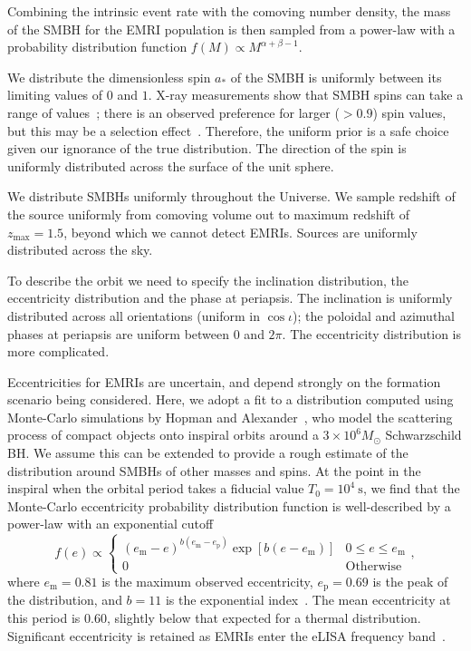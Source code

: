 \documentclass[aps,prd,amsfonts,amssymb,amsmath,nofootinbib,showpacs,superscriptaddress,twocolumn,floatfix]{revtex4-1}
\newcommand{\sub}[1]{\ensuremath{_\mathrm{#1}}}
\begin{document}
Combining the intrinsic event rate with the comoving number density, the mass of the SMBH for the EMRI population is then sampled from a power-law with a probability distribution function $f(M) \propto M^{\alpha+\beta-1}$.

We distribute the dimensionless spin $a_\ast$ of the SMBH is uniformly between its limiting values of $0$ and $1$. X-ray measurements show that SMBH spins can take a range of values~\cite{Reynolds2013a,Patrick2012,Walton2013,BerryThesis2013}; there is an observed preference for larger ($> 0.9$) spin values, but this may be a selection effect~\cite{Brenneman2011}. Therefore, the uniform prior is a safe choice given our ignorance of the true distribution. The direction of the spin is uniformly distributed across the surface of the unit sphere.

We distribute SMBHs uniformly throughout the Universe. We sample redshift of the source uniformly from comoving volume out to maximum redshift of $z\sub{max} = 1.5$, beyond which we cannot detect EMRIs. Sources are uniformly distributed across the sky. 

To describe the orbit we need to specify the inclination distribution, the eccentricity distribution and the   phase at periapsis. The inclination is uniformly distributed across all orientations (uniform in $\cos \iota$); the poloidal and azimuthal phases at periapsis are uniform between $0$ and $2\pi$. The eccentricity distribution is more complicated.

Eccentricities for EMRIs are uncertain, and depend strongly on the formation scenario being considered. Here, we adopt a fit to a distribution computed using Monte-Carlo simulations by Hopman and Alexander~\cite{Hopman2005}, who model the scattering process of compact objects onto inspiral orbits around a $3 \times 10^6 M_\odot$ Schwarzschild BH. We assume this can be extended to provide a rough estimate of the distribution around SMBHs of other masses and spins. At the point in the inspiral when the orbital period takes a fiducial value $T_0 = 10^4~\mathrm{s}$, we find that the Monte-Carlo eccentricity probability distribution function is well-described by a power-law with an exponential cutoff
\begin{equation}
\label{eq:EMRI-e-distribution}
f(e) \propto 
	\begin{cases}
		\left(e\sub{m}-e\right)^{b(e\sub{m}-e\sub{p})} \exp\left[b(e-e\sub{m})\right] & 0 \leq e \leq e\sub{m}\\
		0 & \mathrm{Otherwise}
	\end{cases},
\end{equation}
where $e\sub{m} = 0.81$ is the maximum observed eccentricity, $e\sub{p} = 0.69$ is the peak of the distribution, and $b=11$ is the exponential index~\cite{ColeThesis2015}. The mean eccentricity at this period is $0.60$, slightly below that expected for a thermal distribution. Significant eccentricity is retained as EMRIs enter the eLISA frequency band~\cite{Merritt2015c}. 
\end{document}
